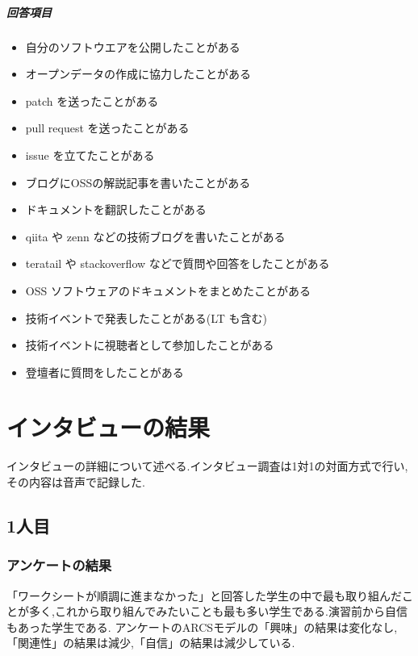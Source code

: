 \documentclass[11pt, a4paper]{jreport}
\begin{document}
\paragraph{回答項目}
\begin{itemize}
\item 自分のソフトウエアを公開したことがある
\item オープンデータの作成に協力したことがある
\item patch を送ったことがある
\item pull request を送ったことがある
\item issue を立てたことがある
\item ブログにOSSの解説記事を書いたことがある
\item ドキュメントを翻訳したことがある
\item qiita や zenn などの技術ブログを書いたことがある
\item teratail や stackoverflow などで質問や回答をしたことがある
\item OSS ソフトウェアのドキュメントをまとめたことがある
\item 技術イベントで発表したことがある(LT も含む)
\item 技術イベントに視聴者として参加したことがある
\item 登壇者に質問をしたことがある
\end{itemize}

\chapter{インタビューの結果}\label{append_interview}
\renewcommand{\thepage}{E--\arabic{page}}

インタビューの詳細について述べる.インタビュー調査は1対1の対面方式で行い,その内容は音声で記録した.

\section{1人目}

\subsection{アンケートの結果}

「ワークシートが順調に進まなかった」と回答した学生の中で最も取り組んだことが多く,これから取り組んでみたいことも最も多い学生である.演習前から自信もあった学生である.
アンケートのARCSモデルの「興味」の結果は変化なし,「関連性」の結果は減少,「自信」の結果は減少している.
\end{document}
